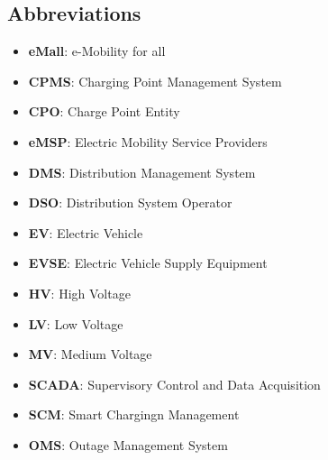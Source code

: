\subsection{Abbreviations}
\begin{itemize}
    \item \textbf{eMall}: e-Mobility for all
    \item \textbf{CPMS}: Charging Point Management System
    \item \textbf{CPO}: Charge Point Entity
    \item \textbf{eMSP}: Electric Mobility Service Providers
    \item \textbf{DMS}: Distribution Management System
    \item \textbf{DSO}: Distribution System Operator
    \item \textbf{EV}: Electric Vehicle
    \item \textbf{EVSE}: Electric Vehicle Supply Equipment
    \item \textbf{HV}: High Voltage
    \item \textbf{LV}: Low Voltage
    \item \textbf{MV}: Medium Voltage
    \item \textbf{SCADA}: Supervisory Control and Data Acquisition
    \item \textbf{SCM}: Smart Chargingn Management 
    \item \textbf{OMS}: Outage Management System
\end{itemize}

